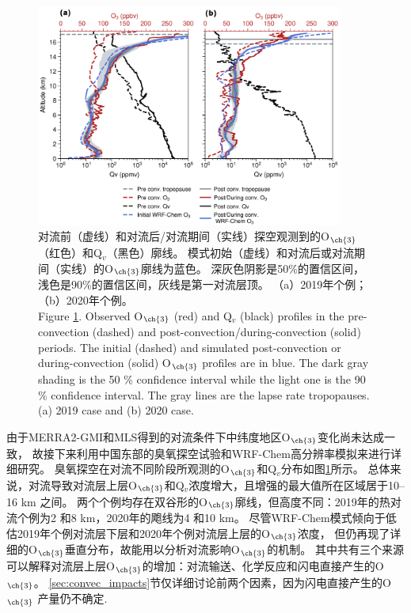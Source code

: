 \begin{figure}[H]
\centering
\includegraphics[width=0.9\textwidth]{./figures/ozonesonde_profile.png}
\caption{对流前（虚线）和对流后/对流期间（实线）探空观测到的O$_{\ch{3}}$（红色）和Q$_v$（黑色）廓线。
模式初始（虚线）和对流后或对流期间（实线）的O$_{\ch{3}}$廓线为蓝色。
深灰色阴影是50\%的置信区间，浅色是90\%的置信区间，灰线是第一对流层顶。
（a）2019年个例；（b）2020年个例。\\
Figure \ref{fig:ozonesonde_profile}. Observed O$_{\ch{3}}$ (red) and Q$_v$ (black) profiles in the pre-convection (dashed) and post-convection/during-convection (solid) periods.
The initial (dashed) and simulated post-convection or during-convection (solid) O$_{\ch{3}}$ profiles are in blue.
The dark gray shading is the 50 \% confidence interval while the light one is the 90 \% confidence interval.
The gray lines are the lapse rate tropopauses.
(a) 2019 case and (b) 2020 case.
}
\label{fig:ozonesonde_profile}
\end{figure}

由于MERRA2-GMI和MLS得到的对流条件下中纬度地区O$_{\ch{3}}$变化尚未达成一致，
故接下来利用中国东部的臭氧探空试验和WRF-Chem高分辨率模拟来进行详细研究。
臭氧探空在对流不同阶段所观测的O$_{\ch{3}}$和Q$_v$分布如图\ref{fig:ozonesonde_profile}所示。
总体来说，对流导致对流层上层O$_{\ch{3}}$和Q$_v$浓度增大，且增强的最大值所在区域居于10--16 km 之间。
两个个例均存在双谷形的O$_{\ch{3}}$廓线，但高度不同：2019年的热对流个例为2 和8 km，2020年的飑线为4 和10 km。
尽管WRF-Chem模式倾向于低估2019年个例对流层下层和2020年个例对流层上层的O$_{\ch{3}}$浓度，
但仍再现了详细的O$_{\ch{3}}$垂直分布，故能用以分析对流影响O$_{\ch{3}}$的机制。
其中共有三个来源可以解释对流层上层O$_{\ch{3}}$的增加：对流输送、化学反应和闪电直接产生的O$_{\ch{3}}$。
\ref{sec:convec_impacts}节仅详细讨论前两个因素，因为闪电直接产生的O$_{\ch{3}}$
产量仍不确定\citep{Morris.2010,Ripoll.2014}.

